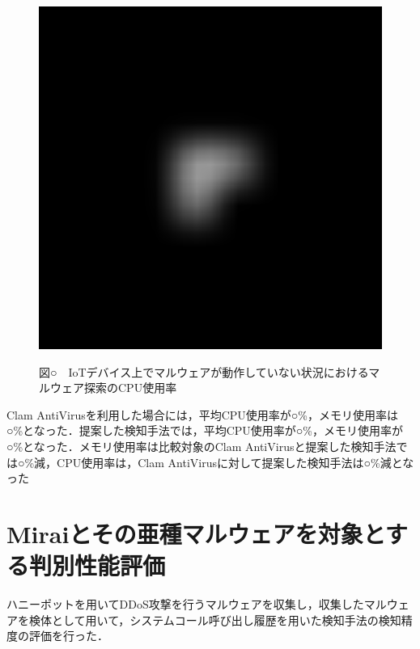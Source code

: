\begin{figure}[h]
        \centering
           \includegraphics[width=120mm]{figures/test.eps}
        \label{fig:model}
        \begin{center}図○　IoTデバイス上でマルウェアが動作していない状況におけるマルウェア探索のCPU使用率\end{center}
\end{figure}
   
 Clam AntiVirusを利用した場合には，平均CPU使用率が○\%，メモリ使用率は○\%となった．提案した検知手法では，平均CPU使用率が○\%，メモリ使用率が○\%となった．メモリ使用率は比較対象のClam AntiVirusと提案した検知手法では○\%減，CPU使用率は，Clam AntiVirusに対して提案した検知手法は○\%減となった


\section{Miraiとその亜種マルウェアを対象とする判別性能評価}
ハニーポットを用いてDDoS攻撃を行うマルウェアを収集し，収集したマルウェアを検体として用いて，システムコール呼び出し履歴を用いた検知手法の検知精度の評価を行った．


